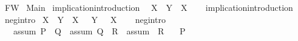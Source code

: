%
\begin{isabellebody}%
%
%
\isadelimtheory
%
\endisadelimtheory
%
\isatagtheory
{}\isamarkupfalse%
\ FW\isanewline
{}\ Main\isanewline
{}%
\endisatagtheory
{\isafoldtheory}%
%
\isadelimtheory
%
\endisadelimtheory
%
\isadelimdocument
%
\endisadelimdocument
%
\isatagdocument
%
\isamarkuptrue%
%
\endisatagdocument
{\isafolddocument}%
%
\isadelimdocument
%
\endisadelimdocument
{}\isamarkupfalse%
\ implication{\isacharunderscore}{\kern0pt}introduction{\isacharcolon}{\kern0pt}\isanewline
\ \ {\isachardoublequoteopen}X\ {\isasymLongrightarrow}\ {\isacharparenleft}{\kern0pt}Y\ {\isasymlongrightarrow}\ X{\isacharparenright}{\kern0pt}{\isachardoublequoteclose}\isanewline
%
\isadelimproof
\ \ %
\endisadelimproof
%
\isatagproof
{}\isamarkupfalse%
%
\endisatagproof
{\isafoldproof}%
%
\isadelimproof
\isanewline
%
\endisadelimproof
\isanewline
{}\isamarkupfalse%
\ implication{\isacharunderscore}{\kern0pt}introduction\isanewline
\isanewline
{}\isamarkupfalse%
\ neg{\isacharunderscore}{\kern0pt}intro{\isacharcolon}{\kern0pt}\isanewline
\ {\isachardoublequoteopen}{\isacharparenleft}{\kern0pt}X\ {\isasymlongrightarrow}\ Y{\isacharparenright}{\kern0pt}\ {\isasymLongrightarrow}\ {\isacharparenleft}{\kern0pt}X\ {\isasymlongrightarrow}\ {\isasymnot}\ Y{\isacharparenright}{\kern0pt}\ {\isasymLongrightarrow}\ {\isasymnot}\ X{\isachardoublequoteclose}\isanewline
%
\isadelimproof
\ \ %
\endisadelimproof
%
\isatagproof
{}\isamarkupfalse%
%
\endisatagproof
{\isafoldproof}%
%
\isadelimproof
\isanewline
%
\endisadelimproof
\isanewline
{}\isamarkupfalse%
\ neg{\isacharunderscore}{\kern0pt}intro\isanewline
\isanewline
{}\isamarkupfalse%
\ \isanewline
\ \ \ assum{}{\isacharcolon}{\kern0pt}\ {\isachardoublequoteopen}P\ {\isasymlongrightarrow}\ Q{\isachardoublequoteclose}\ \ assum{}{\isacharcolon}{\kern0pt}\ {\isachardoublequoteopen}Q\ {\isasymlongrightarrow}\ R{\isachardoublequoteclose}\ \ assum{}{\isacharcolon}{\kern0pt}\ {\isachardoublequoteopen}{\isasymnot}\ R{\isachardoublequoteclose}\isanewline
\ \ \ {\isachardoublequoteopen}{\isasymnot}P{\isachardoublequoteclose}\isanewline
%
\isadelimproof
%
\endisadelimproof
%
\isatagproof
{}\isamarkupfalse%
{\isacharminus}{\kern0pt}\isanewline
\ \ \isamarkupfalse%

\end{isabellebody}
